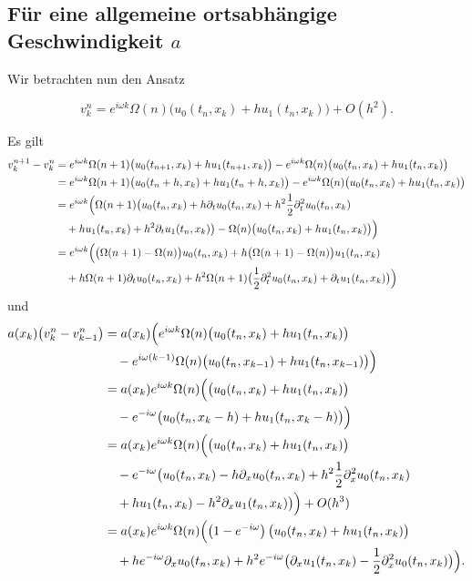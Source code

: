 
\subsection*{Für eine allgemeine ortsabhängige Geschwindigkeit $a$}

Wir betrachten nun den Ansatz

\[ v^n_k = e^{i \omega k} \Omega(n) \bigl( u_0(t_n, x_k) + h u_1(t_n, x_k) \bigr) + O(h^2). \]

Es gilt
\begin{align}
\begin{split}
v^{n+1}_k - v^n_k &= e^{i \omega k} \Omega(n+1) \bigl( u_0(t_{n+1}, x_k) + h u_1(t_{n+1}, x_k) \bigr)
- e^{i \omega k} \Omega(n) \bigl( u_0(t_n, x_k) + h u_1(t_n, x_k) \bigr)\\
&= e^{i \omega k} \Omega(n+1) \bigl( u_0(t_n + h, x_k) + h u_1(t_n + h, x_k) \bigr)
- e^{i \omega k} \Omega(n) \bigl( u_0(t_n, x_k) + h u_1(t_n, x_k) \bigr)\\
&= e^{i \omega k} \Bigl( \Omega(n+1) \bigl( u_0(t_n, x_k) + h \partial_t u_0(t_n, x_k) + h^2 \frac{1}{2} \partial^2_t u_0(t_n, x_k)\\
&\quad + h u_1(t_n, x_k) + h^2 \partial_t u_1(t_n, x_k) \bigr) - \Omega(n) \bigl( u_0(t_n, x_k) + h u_1(t_n, x_k) \bigr) \Bigr)\\
&= e^{i \omega k} \Bigl( \bigl(\Omega(n+1) - \Omega(n) \bigr) u_0(t_n, x_k) + h \bigl(\Omega(n+1) - \Omega(n) \bigr) u_1(t_n, x_k)\\
&\quad + h \Omega(n+1) \partial_t u_0(t_n, x_k) + h^2 \Omega(n+1) \bigl( \frac{1}{2} \partial^2_t u_0(t_n, x_k) + \partial_t u_1(t_n, x_k) \bigr) \Bigr)
\end{split}
\end{align}
und
\begin{align}
\begin{split}
a(x_k) \bigl( v^n_k - v^n_{k-1} \bigr)
&= a(x_k) \Bigl( e^{i \omega k} \Omega(n) \bigl( u_0(t_n, x_k) + h u_1(t_n, x_k) \bigr)\\
&\quad - e^{i \omega (k-1)} \Omega(n) \bigl( u_0(t_n, x_{k-1}) + h u_1(t_n, x_{k-1}) \bigr) \Bigr)\\
&= a(x_k) e^{i \omega k} \Omega(n) \Bigl( \bigl( u_0(t_n, x_k) + h u_1(t_n, x_k) \bigr)\\
&\quad - e^{- i \omega} \bigl( u_0(t_n, x_k-h) + h u_1(t_n, x_k-h) \bigr) \Bigr)\\
&= a(x_k) e^{i \omega k} \Omega(n) \Bigl( \bigl( u_0(t_n, x_k) + h u_1(t_n, x_k) \bigr)\\
&\quad - e^{- i \omega} \bigl( u_0(t_n, x_k) - h \partial_x u_0(t_n, x_k) + h^2 \frac{1}{2} \partial^2_x u_0(t_n, x_k)\\
&\quad + h u_1(t_n, x_k) - h^2 \partial_x u_1(t_n, x_k) \bigr) \Bigr) + O(h^3)\\
&= a(x_k) e^{i \omega k} \Omega(n) \Bigl( \left(1-e^{-i \omega}\right) \bigl( u_0(t_n, x_k) + h u_1(t_n, x_k) \bigr)\\
&\quad + h e^{-i \omega} \partial_x u_0(t_n, x_k) + h^2 e^{-i \omega} \bigl( \partial_x u_1(t_n, x_k) - \frac{1}{2} \partial^2_x u_0(t_n, x_k) \bigr) \Bigr).
\end{split}
\end{align}
